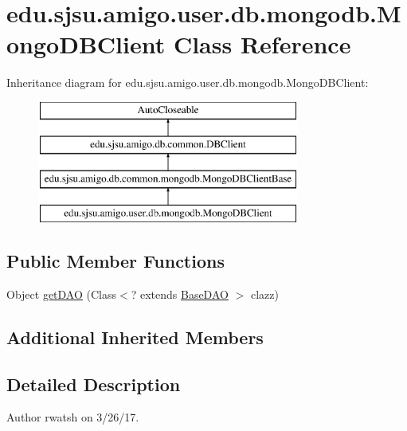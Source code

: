 \hypertarget{classedu_1_1sjsu_1_1amigo_1_1user_1_1db_1_1mongodb_1_1_mongo_d_b_client}{}\section{edu.\+sjsu.\+amigo.\+user.\+db.\+mongodb.\+Mongo\+D\+B\+Client Class Reference}
\label{classedu_1_1sjsu_1_1amigo_1_1user_1_1db_1_1mongodb_1_1_mongo_d_b_client}
Inheritance diagram for edu.\+sjsu.\+amigo.\+user.\+db.\+mongodb.\+Mongo\+D\+B\+Client\+:\begin{figure}[H]
\begin{center}
\leavevmode
\includegraphics[height=4.000000cm]{classedu_1_1sjsu_1_1amigo_1_1user_1_1db_1_1mongodb_1_1_mongo_d_b_client}
\end{center}
\end{figure}
\subsection*{Public Member Functions}
\begin{DoxyCompactItemize}
\item 
Object \hyperlink{classedu_1_1sjsu_1_1amigo_1_1user_1_1db_1_1mongodb_1_1_mongo_d_b_client_aed337080b1cdb29cdc02b10ba51bddc5}{get\+D\+AO} (Class$<$? extends \hyperlink{interfaceedu_1_1sjsu_1_1amigo_1_1db_1_1common_1_1_base_d_a_o}{Base\+D\+AO} $>$ clazz)
\end{DoxyCompactItemize}
\subsection*{Additional Inherited Members}


\subsection{Detailed Description}
\begin{DoxyAuthor}{Author}
rwatsh on 3/26/17. 
\end{DoxyAuthor}


